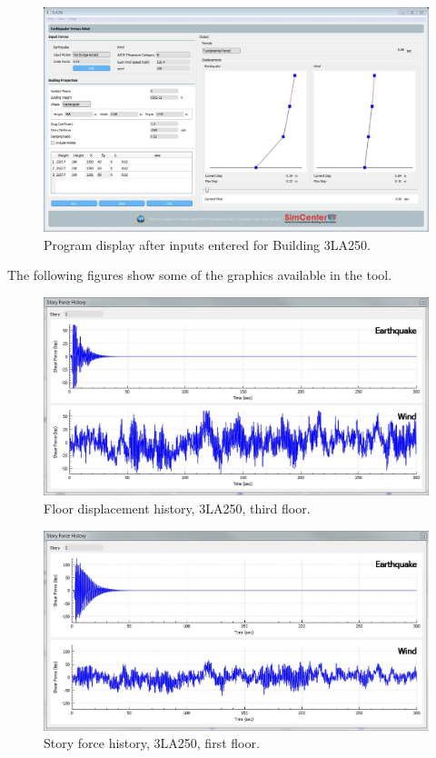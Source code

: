 \documentclass{simcenterdocumentation}
\begin{document}
\begin{figure}[H]
	\centering \includegraphics[width=0.9\linewidth]{3LA250_1.jpg}
	\caption{Program display after inputs entered for Building 3LA250.}
\end{figure}
The following figures show some of the graphics available in the tool.
\begin{figure}[H]
	\centering \includegraphics[scale=0.35]{3LA250_fdh.JPG}
	\caption{Floor displacement history, 3LA250, third floor.}
\end{figure}
\begin{figure}[H]
	\centering \includegraphics[scale=0.35]{3LA250_sfh.JPG}
	\caption{Story force history, 3LA250, first floor.}
\end{figure}
\end{document}
